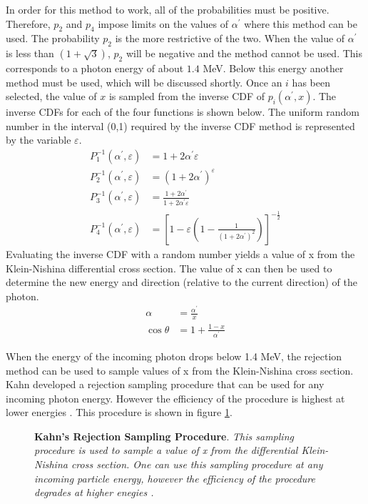 In order for this method to work, all of the probabilities must be positive.
Therefore, $p_2$ and $p_4$ impose limits on the values of $\alpha^{'}$ where this
method can be used. The probability $p_2$ is the more restrictive of the two.
When the value of $\alpha^{'}$ is less than $(1 + \sqrt{3})$, $p_2$ will be 
negative and the method cannot be used. This corresponds to a photon energy of
about $1.4$ MeV. Below this energy another method must be used, which will be 
discussed shortly. Once an $i$ has been selected, the value of $x$ is sampled
from the inverse CDF of $p_i(\alpha^{'},x)$. The inverse CDFs for each of the
four functions is shown below. The uniform random number in the interval (0,1)
required by the inverse CDF method is represented by the variable 
$\varepsilon$.
\begin{align}
  P_1^{-1}(\alpha^{'},\varepsilon) & = 1 + 2\alpha^{'}\varepsilon \\
  P_2^{-1}(\alpha^{'},\varepsilon) & = (1 + 2\alpha^{'})^{\varepsilon} \\
  P_3^{-1}(\alpha^{'},\varepsilon) & = \frac{1 + 2\alpha^{'}}
  {1 + 2\alpha^{'}\varepsilon} \\
  P_4^{-1}(\alpha^{'},\varepsilon) & = \left[1 - \varepsilon\left(1 - 
    \frac{1}{(1 + 2\alpha^{'})^2} \right) \right]^{-\frac{1}{2}}
\end{align}
Evaluating the inverse CDF with a random number yields a value of x from the
Klein-Nishina differential cross section. The value of x can then be used to
determine the new energy and direction (relative to the current direction) of 
the photon.
\begin{align}
  \alpha & = \frac{\alpha^{'}}{x} \\
  \cos{\theta} & = 1 + \frac{1-x}{\alpha^{'}} 
\end{align}

When the energy of the incoming photon drops below 1.4 MeV, the rejection
method can be used to sample values of x from the Klein-Nishina cross section.
Kahn developed a rejection sampling procedure that can be used for any incoming
photon energy. However the efficiency of the procedure is highest at lower 
energies \citep{lux_monte_1991, kahn_applications_1956}. This procedure is
shown in figure \ref{fig:kahn_rejection_sampling}.
\begin{figure}[t!]
  \begin{center}
    \def\svgwidth{300bp}
    
  \end{center}
  \caption{\textbf{Kahn's Rejection Sampling Procedure}.
    \textit{This sampling procedure is used to sample a value of x from the
    differential Klein-Nishina cross section. One can use this sampling
    procedure at any incoming particle energy, however the efficiency of the
    procedure degrades at higher enegies \citep{lux_monte_1991}.}}
  \label{fig:kahn_rejection_sampling}
\end{figure}

